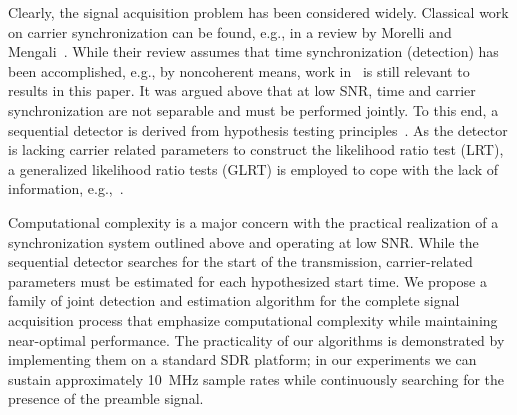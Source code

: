 Clearly, the signal acquisition problem has been considered widely. 
Classical work on carrier synchronization can be found, e.g., in a
review by  Morelli
and Mengali~\cite{Morelli_Mengali_98}. 
While their review assumes that time synchronization (detection) has been
accomplished, e.g., by noncoherent means, 
work in~\cite{kay_89,Fitz_94,Luise_Reggiannini_95}
is still relevant to results in this paper.
It was argued above that at low SNR, time and carrier synchronization
are not separable and must be performed jointly.
To this end, a sequential detector
is  derived from hypothesis testing principles~\cite{Ramakrishnan_10,Chiani_06,Liang_15}.
As the detector is lacking carrier related parameters to construct 
the likelihood ratio test (LRT), a generalized likelihood ratio tests (GLRT)
is employed to cope with the lack of information,
e.g.,~\cite{Chiani_06}.

Computational complexity is a major concern with the practical
realization of a synchronization system outlined above and operating at low SNR.
While the sequential detector searches for the start of the
transmission, carrier-related parameters must be estimated for each
hypothesized start time. 
We propose a family of joint detection and estimation algorithm 
for the complete signal acquisition process
that emphasize computational complexity while maintaining near-optimal performance.
The practicality of our algorithms is demonstrated by implementing
them on a standard SDR platform; in our experiments we can sustain
approximately \SI{10}{\mega\hertz} sample rates while continuously searching
for the presence of the preamble signal.
